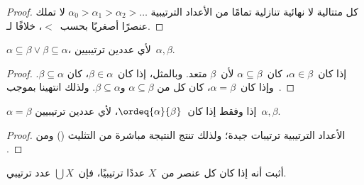 \documentclass[../../../include/open-logic-section]{subfiles}
\begin{document}
\begin{proof}
كل متتالية لا نهائية تنازلية تمامًا من الأعداد الترتيبية
$\alpha_0 > \alpha_1 > \alpha_2 > \ldots$ لا تملك عنصرًا أصغريًا
بحسب~$<$، خلافًا لـ.
\end{proof}

\begin{prop}
$\alpha \subseteq \beta \lor \beta \subseteq \alpha$، لأي عددين
ترتيبيين~$\alpha, \beta$.
\end{prop}

\begin{proof}
إذا كان~$\alpha \in \beta$، كان~$\alpha \subseteq \beta$ لأن~$\beta$
متعد. وبالمثل، إذا كان~$\beta \in \alpha$، كان
$\beta \subseteq \alpha$. وإذا كان~$\alpha = \beta$، كان كل من
$\alpha \subseteq \beta$ و$\beta \subseteq \alpha$. ولذلك انتهينا
بموجب~.
\end{proof}

\begin{prop}
$\alpha = \beta$ إذا وفقط إذا كان~$\ordeq{\alpha}{\beta}$، لأي عددين
ترتيبيين~$\alpha, \beta$.
\end{prop}

\begin{proof}
الأعداد الترتيبية ترتيبات جيدة؛ ولذلك تنتج النتيجة مباشرة من التثليث
() ومن
.
\end{proof}

\begin{prob}
أثبت أنه إذا كان كل عنصر من~$X$ عددًا ترتيبيًا، فإن~$\bigcup X$ عدد
ترتيبي.
\end{prob}
\end{document}
